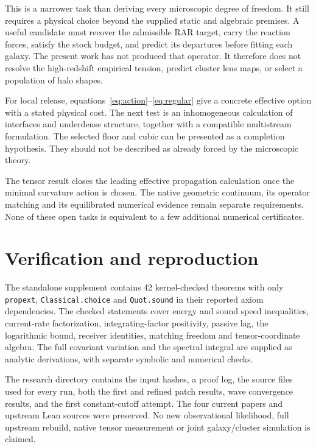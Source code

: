 \documentclass[11pt]{article}
\begin{document}
This is a narrower task than deriving every microscopic degree of freedom.
It still requires a physical choice beyond the supplied static and algebraic
premises. A useful candidate must recover the admissible RAR target, carry
the reaction forces, satisfy the stock budget, and predict its departures
before fitting each galaxy. The present work has not produced that operator.
It therefore does not resolve the high-redshift empirical tension, predict
cluster lens maps, or select a population of halo shapes.

For local release, equations~\eqref{eq:action}--\eqref{eq:regular} give a concrete
effective option with a stated physical cost. The next test is an
inhomogeneous calculation of interfaces and underdense structure, together
with a compatible multistream formulation. The selected floor and cubic can
be presented as a completion hypothesis. They should not be described as
already forced by the microscopic theory.

The tensor result closes the leading effective propagation calculation once
the minimal curvature action is chosen. The native geometric continuum,
its operator matching and its equilibrated numerical evidence remain separate
requirements. None of these open tasks is equivalent to a few additional
numerical certificates.

\section{Verification and reproduction}
The standalone supplement contains 42 kernel-checked theorems with only
\texttt{propext}, \texttt{Classical.choice} and \texttt{Quot.sound} in their
reported axiom dependencies. The checked statements cover energy and sound
speed inequalities, current-rate factorization, integrating-factor positivity,
passive lag, the logarithmic bound, receiver identities, matching freedom and
tensor-coordinate algebra. The full covariant variation and the spectral
integral are supplied as analytic derivations, with separate symbolic and
numerical checks.

The research directory contains the input hashes, a proof log, the source
files used for every run, both the first and refined patch results, wave
convergence results, and the first constant-cutoff attempt. The four current
papers and upstream Lean sources were preserved. No new observational
likelihood, full upstream rebuild, native tensor measurement or joint
galaxy/cluster simulation is claimed.
\end{document}
